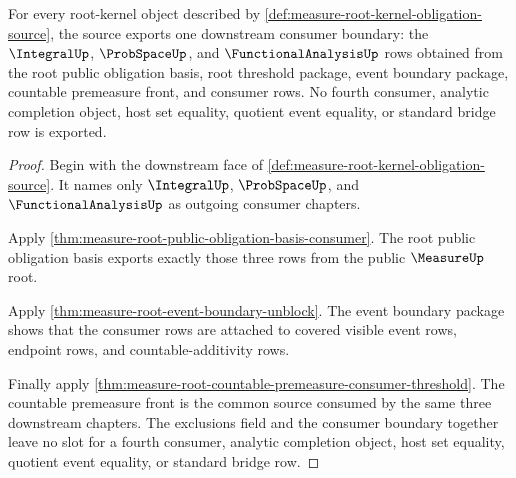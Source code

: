 \begin{theorem}
\label{thm:measure-root-kernel-downstream-consumer-obligation}
For every root-kernel object described by
\autoref{def:measure-root-kernel-obligation-source}, the source exports one
downstream consumer boundary: the $\IntegralUp$, $\ProbSpaceUp$, and
$\FunctionalAnalysisUp$ rows obtained from the root public obligation basis,
root threshold package, event boundary package, countable premeasure front,
and consumer rows. No fourth consumer, analytic completion object, host set
equality, quotient event equality, or standard bridge row is exported.
\end{theorem}
\begin{proof}
Begin with the downstream face of
\autoref{def:measure-root-kernel-obligation-source}. It names only
$\IntegralUp$, $\ProbSpaceUp$, and $\FunctionalAnalysisUp$ as outgoing
consumer chapters.

Apply \autoref{thm:measure-root-public-obligation-basis-consumer}. The root
public obligation basis exports exactly those three rows from the public
$\MeasureUp$ root.

Apply \autoref{thm:measure-root-event-boundary-unblock}. The event boundary
package shows that the consumer rows are attached to covered visible event
rows, endpoint rows, and countable-additivity rows.

Finally apply
\autoref{thm:measure-root-countable-premeasure-consumer-threshold}. The
countable premeasure front is the common source consumed by the same three
downstream chapters. The exclusions field and the consumer boundary together
leave no slot for a fourth consumer, analytic completion object, host set
equality, quotient event equality, or standard bridge row.
\end{proof}
